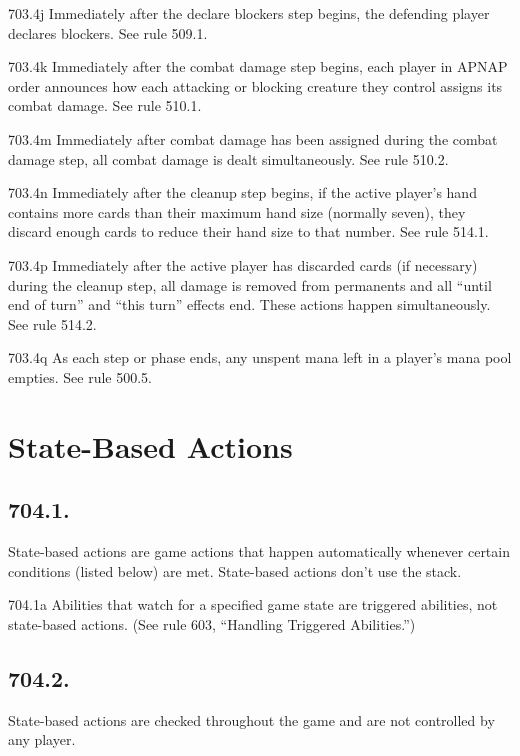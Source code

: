 703.4j Immediately after the declare blockers step begins, the defending player declares blockers. See rule 509.1.

703.4k Immediately after the combat damage step begins, each player in APNAP order announces how each attacking or blocking creature they control assigns its combat damage. See rule 510.1.

703.4m Immediately after combat damage has been assigned during the combat damage step, all combat damage is dealt simultaneously. See rule 510.2.

703.4n Immediately after the cleanup step begins, if the active player’s hand contains more cards than their maximum hand size (normally seven), they discard enough cards to reduce their hand size to that number. See rule 514.1.

703.4p Immediately after the active player has discarded cards (if necessary) during the cleanup step, all damage is removed from permanents and all “until end of turn” and “this turn” effects end. These actions happen simultaneously. See rule 514.2.

703.4q As each step or phase ends, any unspent mana left in a player’s mana pool empties. See rule 500.5.

\section{State-Based Actions}
\subsection*{704.1.}
State-based actions are game actions that happen automatically whenever certain conditions (listed below) are met. State-based actions don’t use the stack.

704.1a Abilities that watch for a specified game state are triggered abilities, not state-based actions. (See rule 603, “Handling Triggered Abilities.”)

\subsection*{704.2.}
State-based actions are checked throughout the game and are not controlled by any player.

